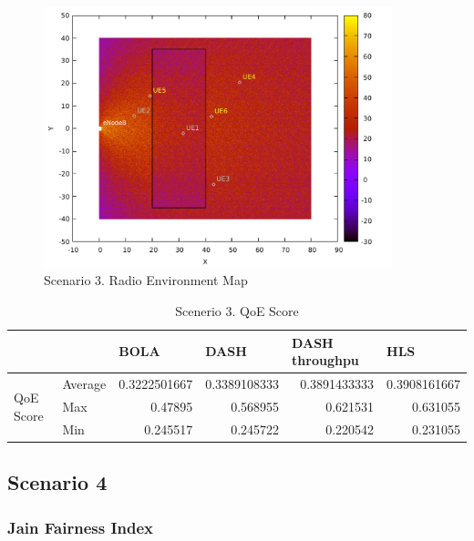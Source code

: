 \begin{figure}[h]
    \centering
    \includegraphics[width=0.9\textwidth]{img/s3i1.pdf}
    \caption{Scenario 3. Radio Environment Map}
    \label{fig:s3i1}
\end{figure}

\begin{table}[]
    \begin{tabular}{@{}llrrrr@{}}
    \toprule
                               &         & \multicolumn{1}{l}{BOLA} & \multicolumn{1}{l}{DASH} & \multicolumn{1}{l}{DASH throughpu} & \multicolumn{1}{l}{HLS} \\ \midrule
    \multirow{3}{*}{QoE Score} & Average & 0.3222501667             & 0.3389108333             & 0.3891433333                       & 0.3908161667            \\
                               & Max     & 0.47895                  & 0.568955                 & 0.621531                           & 0.631055                \\
                               & Min     & 0.245517                 & 0.245722                 & 0.220542                           & 0.231055                \\ \cmidrule(l){2-6} 
    \end{tabular}
    \caption{Scenerio 3. QoE Score}
\end{table}

\subsection{Scenario 4}

\subsubsection{Jain Fairness Index}

